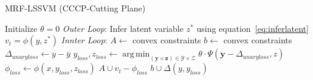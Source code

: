 \documentclass{article}
\DeclareMathOperator*{\argmin}{arg\,min}
\begin{document}
		\begin{algorithm}
							\caption{MRF-LSSVM (CCCP-Cutting Plane)}\label{euclid}
							\begin{algorithmic}[1]
								\State Initialize $\theta=0$
								\State \emph{Outer Loop}:
								\State Infer latent variable $z^*$ using equation~\ref{eq:inferlatent}
								\State $v_t = \phi(y, z^*)$
								\State \emph{Innter Loop}:
								\State $A \gets$ convex constraints
								\State $b \gets$ convex constraints
								\State $\Delta_{unaryloss} \gets y - \bar{y}$
								\State $y_{loss}, z_{loss} \gets \argmin_{(\mathbf{y} \times \mathbf{z}) \in \mathcal{Y} \times \mathcal{Z}}  \theta \cdot \Psi(\mathbf{y} - \Delta_{unaryloss},z)$
								\State $\phi_{loss} \gets \phi(x,y_{loss}, z_{loss})$
								\State $A \cup v_t - \phi_{loss}$
								\State $b \cup \Delta(y,y_{loss})$
								\EndWhile
								\EndWhile
							\end{algorithmic}
		\end{algorithm}
		
	\renewcommand\refname{Bibliography}
	
	
\end{document}
